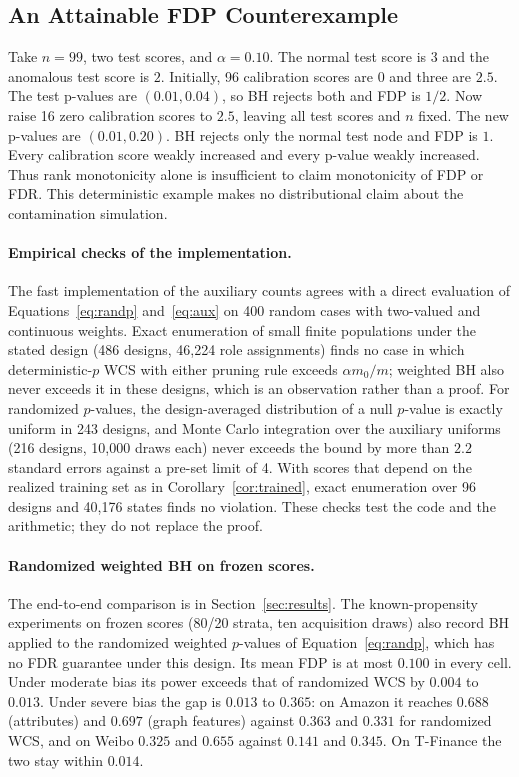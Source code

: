 \documentclass[twoside]{article}
\begin{document}
\subsection{An Attainable FDP Counterexample}
Take $n=99$, two test scores, and $\alpha=0.10$. The normal test score is $3$ and the anomalous test score is $2$. Initially, 96 calibration scores are $0$ and three are $2.5$. The test p-values are $(0.01,0.04)$, so BH rejects both and FDP is $1/2$. Now raise 16 zero calibration scores to $2.5$, leaving all test scores and $n$ fixed. The new p-values are $(0.01,0.20)$. BH rejects only the normal test node and FDP is $1$. Every calibration score weakly increased and every p-value weakly increased. Thus rank monotonicity alone is insufficient to claim monotonicity of FDP or FDR. This deterministic example makes no distributional claim about the contamination simulation.

\clearpage

\paragraph{Empirical checks of the implementation.}
The fast implementation of the auxiliary counts agrees with a direct evaluation of Equations~\eqref{eq:randp} and~\eqref{eq:aux} on 400 random cases with two-valued and continuous weights. Exact enumeration of small finite populations under the stated design (486 designs, 46,224 role assignments) finds no case in which deterministic-$p$ WCS with either pruning rule exceeds $\alpha m_0/m$; weighted BH also never exceeds it in these designs, which is an observation rather than a proof. For randomized $p$-values, the design-averaged distribution of a null $p$-value is exactly uniform in 243 designs, and Monte Carlo integration over the auxiliary uniforms (216 designs, 10,000 draws each) never exceeds the bound by more than $2.2$ standard errors against a pre-set limit of 4. With scores that depend on the realized training set as in Corollary~\ref{cor:trained}, exact enumeration over 96 designs and 40,176 states finds no violation. These checks test the code and the arithmetic; they do not replace the proof.

\paragraph{Randomized weighted BH on frozen scores.}
The end-to-end comparison is in Section~\ref{sec:results}. The known-propensity experiments on frozen scores (80/20 strata, ten acquisition draws) also record BH applied to the randomized weighted $p$-values of Equation~\eqref{eq:randp}, which has no FDR guarantee under this design. Its mean FDP is at most $0.100$ in every cell. Under moderate bias its power exceeds that of randomized WCS by $0.004$ to $0.013$. Under severe bias the gap is $0.013$ to $0.365$: on Amazon it reaches $0.688$ (attributes) and $0.697$ (graph features) against $0.363$ and $0.331$ for randomized WCS, and on Weibo $0.325$ and $0.655$ against $0.141$ and $0.345$. On T-Finance the two stay within $0.014$.
\end{document}

